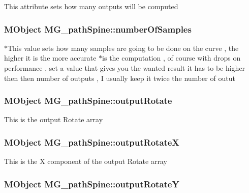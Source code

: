 This attribute sets how many outputs will be computed \hypertarget{class_m_g__path_spine_a1b03cd5d5735caea252ae5cc7f28a53c}{
\subsubsection[{number\-Of\-Samples}]{\setlength{\rightskip}{0pt plus 5cm}M\-Object M\-G\-\_\-path\-Spine\-::number\-Of\-Samples\hspace{0.3cm}{\ttfamily [static]}}}\label{class_m_g__path_spine_a1b03cd5d5735caea252ae5cc7f28a53c}
$\ast$\-This value sets how many samples are going to be done on the curve , the higher it is the more accurate $\ast$is the computation , of course with drops on performance , set a value that gives you the wanted result it has to be higher then then number of outputs , I usually keep it twice the number of outut \hypertarget{class_m_g__path_spine_aa9044a045524a44c3d322c979cc9b8e8}{
\subsubsection[{output\-Rotate}]{\setlength{\rightskip}{0pt plus 5cm}M\-Object M\-G\-\_\-path\-Spine\-::output\-Rotate\hspace{0.3cm}{\ttfamily [static]}}}\label{class_m_g__path_spine_aa9044a045524a44c3d322c979cc9b8e8}
This is the output Rotate array \hypertarget{class_m_g__path_spine_a5d73906fe1c6ec0b372c0ef3da2a0026}{
\subsubsection[{output\-Rotate\-X}]{\setlength{\rightskip}{0pt plus 5cm}M\-Object M\-G\-\_\-path\-Spine\-::output\-Rotate\-X\hspace{0.3cm}{\ttfamily [static]}}}\label{class_m_g__path_spine_a5d73906fe1c6ec0b372c0ef3da2a0026}
This is the X component of the output Rotate array \hypertarget{class_m_g__path_spine_a11b0bb32a6931055ec6d06b595f11b7e}{
\subsubsection[{output\-Rotate\-Y}]{\setlength{\rightskip}{0pt plus 5cm}M\-Object M\-G\-\_\-path\-Spine\-::output\-Rotate\-Y\hspace{0.3cm}{\ttfamily [static]}}}\label{class_m_g__path_spine_a11b0bb32a6931055ec6d06b595f11b7e}
